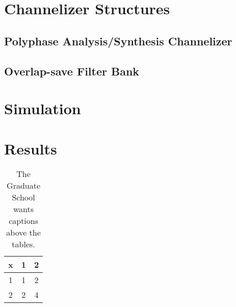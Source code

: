 \documentclass[12pt,dvips]{report}
\begin{document}
\chapter{Channelizer Structures}
\label{sec:chan}
\section{Polyphase Analysis/Synthesis Channelizer}
\label{sec:poly_chan}

\section{Overlap-save Filter Bank}
\label{sec:filter_bank}

\chapter{Simulation}
\label{sec:sim}

\chapter{Results}
\label{sec:results}

%
%

%

 \begin{table}
 \caption{The Graduate School wants captions above the tables.}
\begin{center}
 \begin{tabular}{ccc}
 x & 1 & 2 \\ \hline
 1 & 1 & 2 \\
 2 & 2 & 4 \\ \hline
 \end{tabular}
\end{center}
 \end{table}


%
\end{document}
